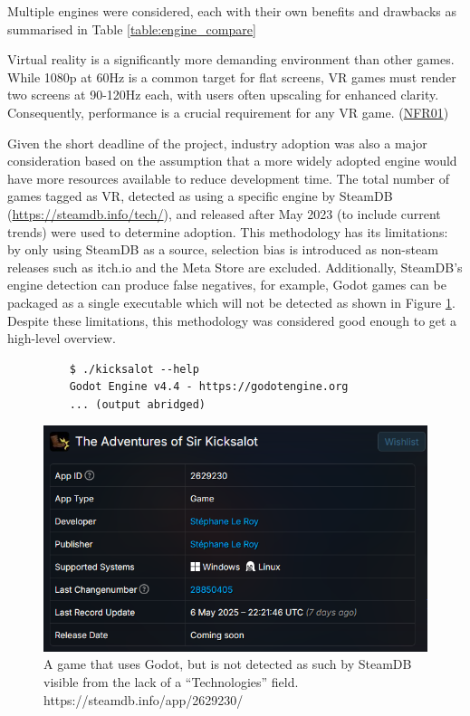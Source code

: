 \documentclass[sigconf,authordraft]{acmart}
\begin{document}
Multiple engines were considered, each with their own benefits
and drawbacks as summarised in Table \ref{table:engine_compare}

Virtual reality is a significantly more demanding environment than other games.
While 1080p at 60Hz is a common target for flat screens, VR games must render
two screens at 90-120Hz each, with users often upscaling for enhanced clarity.
Consequently, performance is a crucial requirement for any VR game.
(\hyperref[sec:nfr_performance]{NFR01})

Given the short deadline of the project, industry adoption was also a major
consideration based on the assumption that a more widely adopted engine would
have more resources available to reduce development time. The total number of
games tagged as VR, detected as using a specific engine by
SteamDB (\url{https://steamdb.info/tech/}), and released
after May 2023 (to include current trends) were used to determine adoption.
This methodology has its limitations: by only using SteamDB as a source,
selection bias is introduced as non-steam releases such as itch.io and the Meta
Store are excluded. Additionally, SteamDB's engine detection can produce false
negatives, for example, Godot games can be packaged as a single executable which
will not be detected as shown in Figure \ref{fig:godot_false_negative}. Despite
these limitations, this methodology was considered good enough to get a
high-level overview.

\begin{figure}[h]
  \begin{lstlisting}
    $ ./kicksalot --help
    Godot Engine v4.4 - https://godotengine.org
    ... (output abridged)
  \end{lstlisting}
  \includegraphics[width=0.8\linewidth]{godot-false-negative.png}
  \caption{\label{fig:godot_false_negative} A game that uses Godot, but is not
    detected as such by SteamDB visible from the lack of a ``Technologies''
  field. https://steamdb.info/app/2629230/}
\end{figure}
\end{document}
